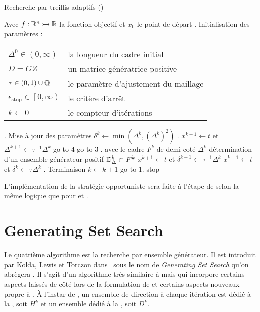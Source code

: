 \begin{algorithm}[H]
	\caption{\textsf{Recherche par treillis adaptifs} (\MADS)}
	\label{alg:mad}
	\begin{algorithmic}
		\STATE Avec $f:\mathbb{R}^n \rightarrowtail \mathbb{R}$ la fonction objectif et $x_0$ le point de départ
		. \textsf{Initialisation des paramètres} : 
		\bindent
		\STATE\begin{flushleft}
			\begin{tabular}{l l}
				$\Delta^0 \in (0,\infty)$ & la longueur du cadre initial\\
				$D=GZ$ & un matrice génératrice positive\\
				$\tau \in (0,1) \cup \mathbb{Q}$ & le paramètre d'ajustement du maillage\\
				$\epsilon_{\text{stop}} \in \left[ 0,\infty \right) $ & le critère d'arrêt\\
				$k \leftarrow 0$ & le compteur d'itérations\\
			\end{tabular}
		\end{flushleft}
		\eindent
		. \textsf{Mise à jour des paramètres}
		\bindent
		\STATE $\delta^k \leftarrow \min(\Delta^k,(\Delta^k)^2)$
		\eindent
		. \SEARCH
		\bindent
		\STATE $x^{k+1} \leftarrow t$ et $\Delta^{k+1} \leftarrow \tau ^{-1}\Delta^k$
		\STATE go to 4
		\ELSE
		\STATE go to 3
		\ENDIF
		\eindent
		. \POLL
		\bindent
		\STATE avec le cadre $F^k$ de demi-coté $\Delta^k$
		\STATE détermination d'un ensemble générateur positif $\mathbb{D}^k_\Delta \subset F^k$
		\STATE $x^{k+1} \leftarrow t$ et $\delta^{k+1} \leftarrow \tau ^{-1}\Delta^k$
		\ELSE
		\STATE $x^{k+1} \leftarrow t$ et $\delta^{k} \leftarrow \tau\Delta^k$
		\ENDIF
		\eindent
		. \textsf{Terminaison}
		\bindent
		\STATE $k\leftarrow k+1$
		\STATE go to 1.
		\ELSE
		\STATE stop
		\ENDIF
		\eindent
	\end{algorithmic}
\end{algorithm}
L'implémentation de la stratégie opportuniste sera faite à l'étape de \POLL selon la même logique que pour \CS et \GPS. 
\section{Generating Set Search}\label{sec:gss}
Le quatrième algorithme est la recherche par ensemble générateur. Il est introduit par Kolda, Lewis et Torczon dans~\cite{KoLeTo03a} sous le nom de \textit{Generating Set Search} qu'on abrègera \GSS. Il s'agit d'un algorithme très similaire à \GPS mais qui incorpore certains aspects laissés de côté lors de la formulation de \GPS et certains aspects nouveaux propre à \GSS. À l'instar de \GSS, un ensemble de direction à chaque itération est dédié à la \SEARCH, soit $H^k$ et un ensemble dédié à la \POLL, soit $D^k$.

